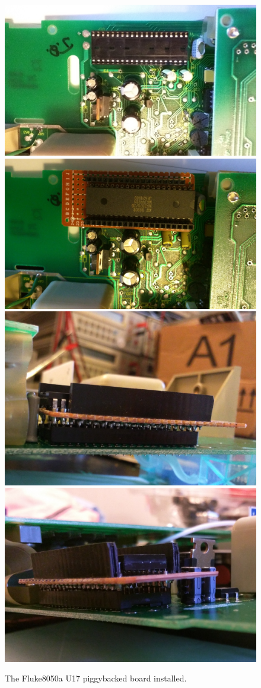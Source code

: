 \documentclass[a4paper,10pt]{article}
\begin{document}
\begin{figure}[h!t] \centering
    \includegraphics[width=0.45\linewidth]{figures/pic-u17-origin.jpg}
    \includegraphics[width=0.45\linewidth]{figures/pic-u17-piggybacked-1.jpg}
    \includegraphics[width=0.45\linewidth]{figures/pic-u17-piggybacked-2.jpg}
    \includegraphics[width=0.45\linewidth]{figures/pic-u17-piggybacked-3.jpg}
    \caption{The Fluke8050a U17 piggybacked board installed.} \label{fig:picf8050apiggy}
\end{figure}
\end{document}

